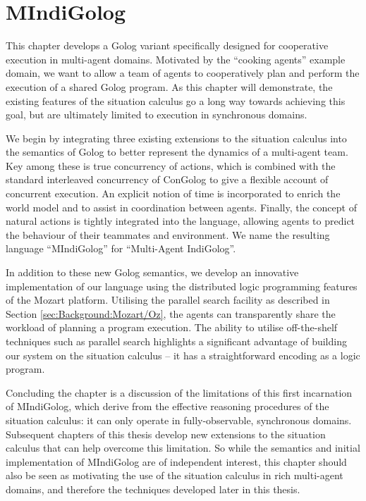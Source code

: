 

\chapter{MIndiGolog}

\label{ch:mindigolog}

This chapter develops a Golog variant specifically designed for cooperative
execution in multi-agent domains. Motivated by the {}``cooking agents''
example domain, we want to allow a team of agents to cooperatively
plan and perform the execution of a shared Golog program. As this
chapter will demonstrate, the existing features of the situation calculus
go a long way towards achieving this goal, but are ultimately limited
to execution in synchronous domains.

We begin by integrating three existing extensions to the situation
calculus into the semantics of Golog to better represent the dynamics
of a multi-agent team. Key among these is true concurrency of actions,
which is combined with the standard interleaved concurrency of ConGolog
to give a flexible account of concurrent execution. An explicit notion
of time is incorporated to enrich the world model and to assist in
coordination between agents. Finally, the concept of natural actions
is tightly integrated into the language, allowing agents to predict
the behaviour of their teammates and environment. We name the resulting
language {}``MIndiGolog'' for {}``Multi-Agent IndiGolog''.

In addition to these new Golog semantics, we develop an innovative
implementation of our language using the distributed logic programming
features of the Mozart platform. Utilising the parallel search facility
as described in Section \ref{sec:Background:Mozart/Oz}, the agents
can transparently share the workload of planning a program execution.
The ability to utilise off-the-shelf techniques such as parallel search
highlights a significant advantage of building our system on the situation
calculus -- it has a straightforward encoding as a logic program.

Concluding the chapter is a discussion of the limitations of this
first incarnation of MIndiGolog, which derive from the effective reasoning
procedures of the situation calculus: it can only operate in fully-observable,
synchronous domains. Subsequent chapters of this thesis develop new
extensions to the situation calculus that can help overcome this limitation.
So while the semantics and initial implementation of MIndiGolog are
of independent interest, this chapter should also be seen as motivating
the use of the situation calculus in rich multi-agent domains, and
therefore the techniques developed later in this thesis.

